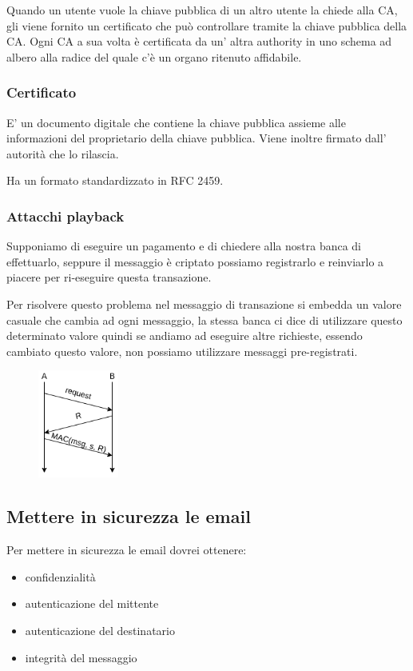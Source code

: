 Quando un utente vuole la chiave pubblica di un altro utente la chiede alla CA, gli viene fornito un certificato che può controllare tramite la chiave pubblica della CA.
Ogni CA a sua volta è certificata da un' altra authority in uno schema ad albero alla radice del quale c'è un organo ritenuto affidabile.

\subsubsection{Certificato}
E' un documento digitale che contiene la chiave pubblica assieme alle informazioni del proprietario della chiave pubblica.
Viene inoltre firmato dall' autorità che lo rilascia.

Ha un formato standardizzato in RFC 2459.

\subsubsection{Attacchi playback}
Supponiamo di eseguire un pagamento e di chiedere alla nostra banca di effettuarlo, seppure il messaggio è criptato possiamo registrarlo e reinviarlo a piacere per ri-eseguire questa transazione.

Per risolvere questo problema nel messaggio di transazione si embedda un valore casuale che cambia ad ogni messaggio, la stessa banca ci dice di utilizzare questo determinato valore quindi se andiamo ad eseguire altre richieste, essendo cambiato questo valore, non possiamo utilizzare messaggi pre-registrati.

\begin{figure}[H]
    \centering
    \includegraphics[width=100px]{images/7_Security/nonce_usage.png}
\end{figure}

\subsection{Mettere in sicurezza le email}
Per mettere in sicurezza le email dovrei ottenere:
\begin{itemize}
    \item confidenzialità
    \item autenticazione del mittente
    \item autenticazione del destinatario
    \item integrità del messaggio
\end{itemize}

